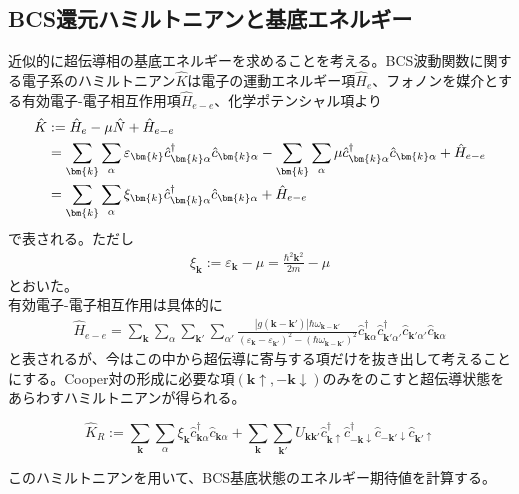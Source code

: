 \documentclass[dvipdfmx, 11pt, a4paper]{jsarticle}
\numberwithin{equation}{section}
\theoremstyle{definition}
\begin{document}
\subsection{BCS還元ハミルトニアンと基底エネルギー}
    近似的に超伝導相の基底エネルギーを求めることを考える。BCS波動関数に関する電子系のハミルトニアン$\hat{K}$は電子の運動エネルギー項$\hat{H}_e$、フォノンを媒介とする有効電子-電子相互作用項$\hat{H}_{e-e}$、化学ポテンシャル項より
    \begin{align}
        \hat{K} &:= \hat{H}_{e} - \mu\hat{N} + \hat{H}_{e-e} \notag \\
        &= \sum_{\bm{k}} \sum_{\alpha} \varepsilon_{\bm{k}} \hat{c}_{\bm{k}\alpha}^\dagger \hat{c}_{\bm{k}\alpha} - \sum_{\bm{k}}\sum_{\alpha} \mu \hat{c}_{\bm{k}\alpha}^\dagger \hat{c}_{\bm{k}\alpha} + \hat{H}_{e-e} \notag \\
        &= \sum_{\bm{k}}\sum_{\alpha} \xi_{\bm{k}} \hat{c}_{\bm{k}\alpha}^\dagger \hat{c}_{\bm{k}\alpha} + \hat{H}_{e-e}
    \end{align}
    で表される。ただし
    \begin{align}
        \xi_{\bm{k}} := \varepsilon_{\bm{k}} - \mu = \frac{\hbar^2 \bm{k}^2}{2m} - \mu
    \end{align}
    とおいた。\\
    有効電子-電子相互作用は具体的に
    \begin{align}
        \hat{H}_{e-e} = \sum_{\bm{k}}\sum_{\alpha}\sum_{\bm{k}'}\sum_{\alpha'} \frac{|g(\bm{k}-\bm{k}')|\hbar \omega_{\bm{k}-\bm{k}'}}{(\varepsilon_{\bm{k}}-\varepsilon_{\bm{k}'})^2-(\hbar\omega_{\bm{k}-\bm{k}'})^2}\hat{c}_{\bm{k}\alpha}^\dagger \hat{c}_{\bm{k}'\alpha'}^\dagger \hat{c}_{\bm{k}'\alpha'}\hat{c}_{\bm{k}\alpha}
    \end{align}
    と表されるが、今はこの中から超伝導に寄与する項だけを抜き出して考えることにする。Cooper対の形成に必要な項$(\bm{k}\uparrow,-\bm{k}\downarrow)$のみをのこすと超伝導状態をあらわすハミルトニアンが得られる。
    \begin{definition}[BCS還元ハミルトニアン]
        \begin{equation}
            \hat{K}_{R} := \sum_{\bm{k}}\sum_{\alpha} \xi_{\bm{k}} \hat{c}^\dagger_{\bm{k}\alpha} \hat{c}_{\bm{k}\alpha} + \sum_{\bm{k}}\sum_{\bm{k}'} U_{\bm{k}\bm{k}'} \hat{c}_{\bm{k}\uparrow}^\dagger \hat{c}_{-\bm{k}\downarrow}^\dagger \hat{c}_{-\bm{k}'\downarrow}\hat{c}_{\bm{k}'\uparrow}
        \end{equation}
    \end{definition}
    このハミルトニアンを用いて、BCS基底状態のエネルギー期待値を計算する。
\end{document}
